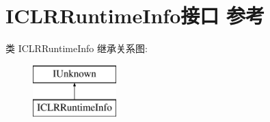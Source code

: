 \hypertarget{interface_i_c_l_r_runtime_info}{}\section{I\+C\+L\+R\+Runtime\+Info接口 参考}
\label{interface_i_c_l_r_runtime_info}
类 I\+C\+L\+R\+Runtime\+Info 继承关系图\+:\begin{figure}[H]
\begin{center}
\leavevmode
\includegraphics[height=2.000000cm]{interface_i_c_l_r_runtime_info}
\end{center}
\end{figure}
